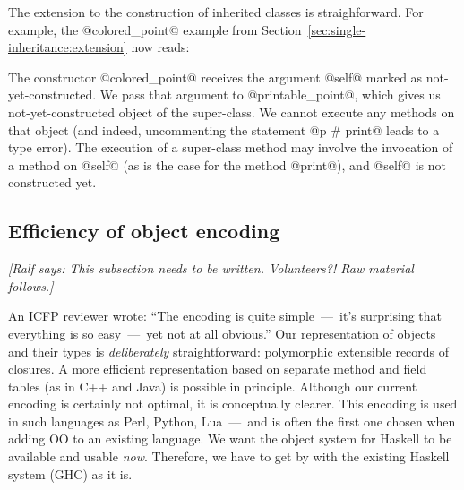 \documentclass{jfp}
\newcommand{\ralf}[1]{{\it [Ralf says: #1]}}
\begin{document}
The extension to the construction of inherited classes is
straighforward. For example, the @colored_point@ example from
Section~\ref{sec:single-inheritance:extension} now reads:



The constructor @colored_point@ receives the argument @self@ marked as
not-yet-constructed. We pass that argument to @printable_point@, which
gives us not-yet-constructed object of the super-class. We cannot
execute any methods on that object (and indeed, uncommenting the
statement @p # print@ leads to a type error). The execution of a
super-class method may involve the invocation of a method on @self@
(as is the case for the method @print@), and @self@ is not constructed
yet.







\subsection{Efficiency of object encoding}

\ralf{This subsection needs to be written. Volunteers?!
Raw material follows.}

An ICFP reviewer wrote: ``The encoding is quite simple~---~it's
surprising that everything is so easy~---~yet not at all obvious.''
Our representation of objects and their types is \emph{deliberately}
straightforward: polymorphic extensible records of closures. A more
efficient representation based on separate method and field tables (as
in C++ and Java) is possible in principle. Although our current
encoding is certainly not optimal, it is conceptually clearer. This
encoding is used in such languages as Perl, Python, Lua~---~and is
often the first one chosen when adding OO to an existing language. We
want the object system for Haskell to be available and usable
\emph{now}. Therefore, we have to get by with the existing Haskell
system (GHC) as it is.
\end{document}
